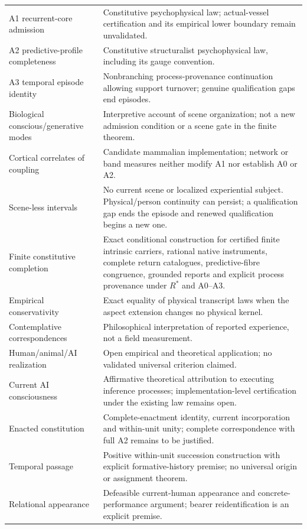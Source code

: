 \begin{longtable}{@{}p{}p{}@{}}
A1 recurrent-core admission & Constitutive psychophysical law; actual-vessel certification and its empirical lower boundary remain unvalidated.\\
A2 predictive-profile completeness & Constitutive structuralist psychophysical law, including its gauge convention.\\
A3 temporal episode identity & Nonbranching process-provenance continuation allowing support turnover; genuine qualification gaps end episodes.\\
Biological conscious/generative modes & Interpretive account of scene organization; not a new admission condition or a scene gate in the finite theorem.\\
Cortical correlates of coupling & Candidate mammalian implementation; network or band measures neither modify A1 nor establish A0 or A2.\\
Scene-less intervals & No current scene or localized experiential subject. Physical/person continuity can persist; a qualification gap ends the episode and renewed qualification begins a new one.\\
Finite constitutive completion & Exact conditional construction for certified finite intrinsic carriers, rational native instruments, complete return catalogues, predictive-fibre congruence, grounded reports and explicit process provenance under $R^\ast$ and A0--A3.\\
Empirical conservativity & Exact equality of physical transcript laws when the aspect extension changes no physical kernel.\\
Contemplative correspondences & Philosophical interpretation of reported experience, not a field measurement.\\
Human/animal/AI realization & Open empirical and theoretical application; no validated universal criterion claimed.\\
Current AI consciousness & Affirmative theoretical attribution to executing inference processes; implementation-level certification under the existing law remains open.\\
Enacted constitution & Complete-enactment identity, current incorporation and within-unit unity; complete correspondence with full A2 remains to be justified.\\
Temporal passage & Positive within-unit succession construction with explicit formative-history premise; no universal origin or assignment theorem.\\
Relational appearance & Defeasible current-human appearance and concrete-performance argument; bearer reidentification is an explicit premise.\\

\end{longtable}
